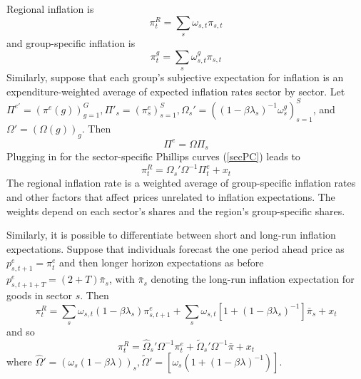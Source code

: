 \documentclass[12pt]{article}
\begin{document}
Regional inflation is 
$$\pi^R_t = \sum_{s}\omega_{s,t}\pi_{s,t}$$
and group-specific inflation is
$$ \pi^g_t = \sum_s\omega^g_{s,t}\pi_{s,t}$$
Similarly, suppose that each group's subjective expectation for inflation is an expenditure-weighted average of expected inflation rates sector by sector. Let $\Pi^{e'}=\left(\pi^e(g)\right)_{g=1}^{G}, \Pi'_s=\left(\pi^e_s\right)_{s=1}^{S}, \Omega_s' = \left(\left(1-\beta\lambda_s\right)^{-1}\omega^g_s\right)_{s=1}^{S}$, and $\Omega' = \left(\Omega(g)\right)_g$. Then
\begin{equation}\label{Ident}
 \Pi^e = \Omega\Pi_s
\end{equation}
Plugging in for the sector-specific Phillips curves (\ref{secPC}) leads to
\begin{equation}\label{LOM}
\pi^R_t = \Omega_s'\Omega^{-1}\Pi^e_t + x_t
\end{equation}
The regional inflation rate is a weighted average of group-specific inflation rates and other factors that affect prices unrelated to inflation expectations. The weights depend on each sector's shares and the region's group-specific shares.

Similarly, it is possible to differentiate between short and long-run inflation expectations. Suppose that individuals forecast the one period ahead price as $p^e_{s,t+1} = \pi^e_t$ and then longer horizon expectations as before $p^e_{s,t+1+T} = (2+T)\bar{\pi}_s$, with $\bar{\pi}_s$ denoting the long-run inflation expectation for goods in sector $s$. Then
$$ \pi_t^R = \sum_s\omega_{s,t}\left( 1-\beta\lambda_s\right)\pi^e_{s,t+1}+\sum_s\omega_{s,t}\left[1+\left(1-\beta\lambda_s\right)^{-1}\right]\bar{\pi}_s + x_t$$
and so
$$ \pi_t^R = \hat{\Omega}_s'\Omega^{-1}\pi^e_t + \tilde{\Omega}_s'\Omega^{-1}\bar{\pi}+x_t$$
where $\hat{\Omega}'=\left(\omega_s(1-\beta\lambda)\right)_{s}, \tilde{\Omega}' = \left[ \omega_s\left( 1+(1-\beta\lambda )^{-1}\right)\right]$.
\end{document}
